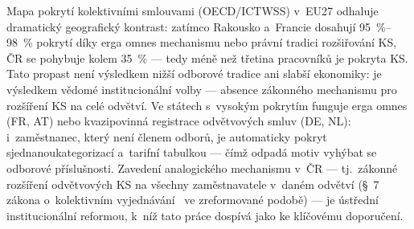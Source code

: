 Mapa pokrytí kolektivními smlouvami (OECD/ICTWSS) v~EU27 odhaluje dramatický geografický kontrast: zatímco Rakousko a~Francie dosahují \SIrange{95}{98}{\percent} pokrytí díky erga omnes mechanismu nebo právní tradici rozšiřování \ac{KS}, ČR se pohybuje kolem \SI{35}{\percent} --- tedy méně než třetina pracovníků je pokryta \ac{KS}.
Tato propast není výsledkem nižší odborové tradice ani slabší ekonomiky: je výsledkem vědomé institucionální volby --- absence zákonného mechanismu pro rozšíření \ac{KS} na celé odvětví.
Ve státech s~vysokým pokrytím funguje erga omnes (FR, AT) nebo kvazipovinná registrace odvětvových smluv (DE, NL): i~zaměstnanec, který není členem odborů, je automaticky pokryt sjednanoukategorizací a~tarifní tabulkou --- čímž odpadá motiv vyhýbat se odborové příslušnosti.
Zavedení analogického mechanismu v~ČR --- tj.~zákonné rozšíření odvětvových \ac{KS} na všechny zaměstnavatele v~daném odvětví (§~7 zákona o~kolektivním vyjednávání~\cite{zakon_kv_1991} ve zreformované podobě) --- je ústřední institucionální reformou, k~níž tato práce dospívá jako ke klíčovému doporučení.


